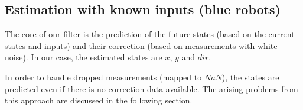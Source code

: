 \subsection{Estimation with known inputs (blue robots)}
The core of our filter is the prediction of the future states (based on the current states and inputs) and their correction (based on measurements with white noise). In our case, the estimated states are \(x\), \(y\) and \(dir\).


\parskip 20pt

In order to handle dropped measurements (mapped to \(NaN\)), the states are predicted even if there is no correction data available. The arising problems from this approach are discussed in the following section.


\parskip 10pt

